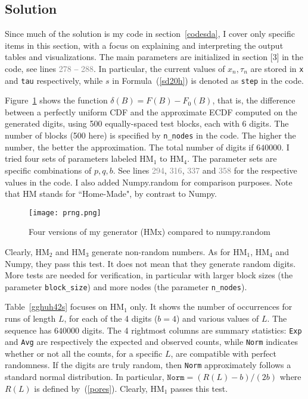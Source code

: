 \documentclass[oneside,10pt]{book}
\begin{document}
 
 \subsection{Solution}

Since much of the solution is my code in section~\ref{codesda}, I cover only specific items in this section, with a focus on explaining and interpreting the output tables and visualizations. The main parameters are initialized in section [3] in the code, see lines \textcolor{gray}{278} -- \textcolor{gray}{288}. In particular, the current values of $x_n, \tau_n$ are stored in \texttt{x} and \texttt{tau} respectively, while $s$ in Formula~(\ref{sd20h}) is
 denoted as \texttt{step} in the code. 

Figure~\ref{fig:scprngf} shows the function $\delta(B) = F(B) - F_0(B)$, that is, the difference between a perfectly uniform CDF and 
the approximate ECDF computed on the  generated digits, using 500 equally-spaced test blocks, each with 6 digits. The number of blocks (500 here) is specified by \texttt{n\_nodes} in the code. The higher the number, the better the approximation. The total number of digits if $\num{640000}$.
I tried four sets of parameters labeled HM$_1$ to HM$_4$.  The parameter sets are specific combinations of $p, q, b$.
 See lines \textcolor{gray}{294}, \textcolor{gray}{316}, \textcolor{gray}{337} and \textcolor{gray}{358} for the respective values in the code.
I also added Numpy.random for comparison purposes. Note that  HM stands for ``Home-Made", by contrast to Numpy. 

\begin{figure}[H]
\centering
\texttt{[image: prng.png]}   
\caption{Four versions of my generator (HMx) compared to numpy.random}
\label{fig:scprngf}
\end{figure}

Clearly, HM$_2$ and HM$_3$ generate non-random numbers. As for HM$_1$, HM$_4$ and Numpy, they pass this test. It does not mean that they generate random digits. More tests are needed for verification, in particular with larger block sizes 
 (the parameter \texttt{block\_size}) and more nodes (the parameter
 \texttt{n\_nodes}).  

Table~\ref{gghuh42s} focuses on HM$_1$ only. It shows the number of occurrences for runs of length $L$, for each of the 4 digits ($b=4$) and various values of $L$.  The sequence has $\num{640000}$ digits. The 4 rightmost columns are summary statistics: \texttt{Exp} and \texttt{Avg} are 
respectively the expected and observed counts, while \texttt{Norm} indicates whether or not all the counts, for a specific $L$,
 are compatible with perfect randomness. If the digits are truly random, then \texttt{Norm} approximately follows a standard normal distribution. In particular,  $\texttt{Norm} = (R(L) -b) / (2b)$ where $R(L)$ is defined by~(\ref{pores}).
Clearly, HM$_1$ passes this test.
\end{document}
